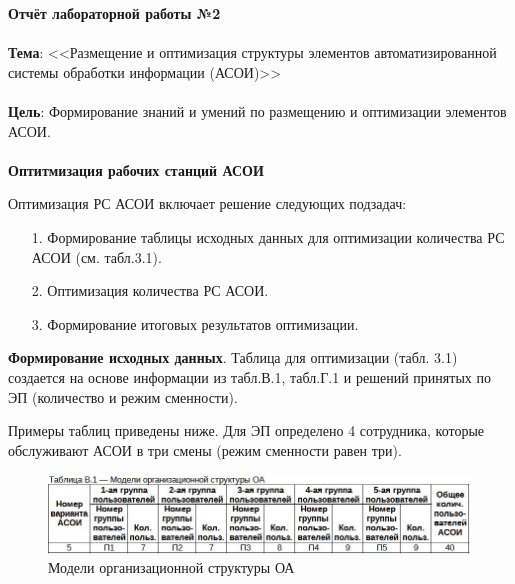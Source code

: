 \documentclass[12pt, a4paper, simple]{eskdtext}
\def \gpiDocNum {2}
\def \gpiTopicRep {Размещение и оптимизация структуры элементов
автоматизированной системы обработки информации (АСОИ)}
\def \gpiDocTopic {Отчёт лабораторной работы №\gpiDocNum}
\begin{document}
    
    \thispagestyle{plain}
    \pagestyle{plain}

    \begin{center}
        \textbf{\gpiDocTopic}
    \end{center}

    \paragraph{} \textbf{Тема}: <<\gpiTopicRep>>

    \paragraph{} \textbf{Цель}:
    Формирование знаний и умений по размещению и оптимизации элементов АСОИ.

    \paragraph{} \textbf{Оптитмизация рабочих станций АСОИ}

    Оптимизация РС АСОИ включает решение следующих подзадач:
    
    \begin{enumerate}
        \item[1.] Формирование таблицы исходных данных для оптимизации количества РС АСОИ (см. табл.3.1).
        \item[2.] Оптимизация количества РС АСОИ.
        \item[3.] Формирование итоговых результатов оптимизации.
    \end{enumerate}

    \textbf{Формирование исходных данных}.
    Таблица для оптимизации (табл. 3.1) создается на основе информации из табл.В.1, табл.Г.1
    и решений принятых по ЭП (количество и режим сменности).

    Примеры таблиц приведены ниже.
    Для ЭП определено 4 сотрудника, которые обслуживают АСОИ в три смены (режим сменности равен три).

    \begin{figure}[h!]
        \centering
        \includegraphics[width=14cm]
            {_docs/ТаблицаВ1МоделиОрганизационнойСтруктурыОА.jpg}
        \caption{Модели организационной структуры ОА}
    \end{figure}
\end{document}
